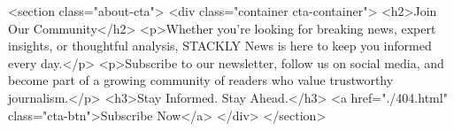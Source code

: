     <section class="about-cta">
        <div class="container cta-container">
            <h2>Join Our Community</h2>
            <p>Whether you're looking for breaking news, expert insights, or thoughtful analysis, STACKLY News is here to keep you informed every day.</p>
            <p>Subscribe to our newsletter, follow us on social media, and become part of a growing community of readers who value trustworthy journalism.</p>
            <h3>Stay Informed. Stay Ahead.</h3>
            <a href="./404.html" class="cta-btn">Subscribe Now</a>
        </div>
    </section>